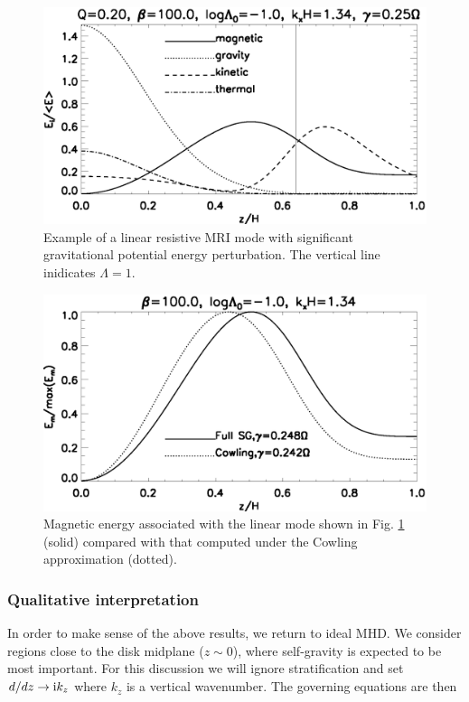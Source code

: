\begin{figure}
  \includegraphics[width=\linewidth]{figures/result_resis_sg}
  \caption{Example of a linear resistive MRI mode with significant
    gravitational potential energy perturbation.  The vertical line
    inidicates $\Lambda=1$.  
    \label{mri_massive_resis}}
\end{figure}


\begin{figure}
  \includegraphics[width=\linewidth]{figures/compare_result_cowling}
  \caption{Magnetic energy associated with the linear mode shown in
    Fig. \ref{mri_massive_resis} (solid) compared with that computed
    under the Cowling approximation (dotted). 
    \label{mri_massive_cowling}}
\end{figure}

\subsubsection{Qualitative interpretation} 
In order to make sense of the above results, we return to ideal MHD. 
We consider regions close to the disk midplane ($z\sim 0$), where
self-gravity is expected to be most important. For this discussion we
will ignore stratification and set $d/dz\to \mathrm{i} k_z$ where $k_z$ is
a vertical wavenumber. The governing equations are then

